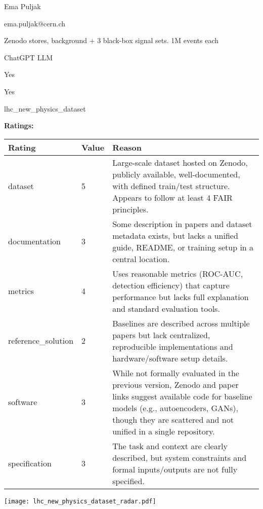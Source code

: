 {{\begin{description}[labelwidth=4cm, labelsep=1em, leftmargin=4cm, itemsep=0.1em, parsep=0em]
  \item[contact.name:] Ema Puljak
  \item[contact.email:] ema.puljak@cern.ch
  \item[datasets.links.name:] Zenodo stores, background + 3 black-box signal sets. 1M events each
  \item[results.links.name:] ChatGPT LLM
  \item[fair.reproducible:] Yes
  \item[fair.benchmark\_ready:] Yes
  \item[id:] lhc\_new\_physics\_dataset
  \item[Citations:] \cite{https://doi.org/10.5281/zenodo.5046389}
\end{description}

{\bf Ratings:} ~ \\

\begin{tabular}{p{} p{} p{}}
\hline
Rating & Value & Reason \\
\hline
dataset & 5 & Large-scale dataset hosted on Zenodo, publicly available, well-documented, with defined train/test structure.
Appears to follow at least 4 FAIR principles.
 \\
documentation & 3 & Some description in papers and dataset metadata exists, but lacks a unified guide, README,
or training setup in a central location.
 \\
metrics & 4 & Uses reasonable metrics (ROC-AUC, detection efficiency) that capture performance but lacks
full explanation and standard evaluation tools.
 \\
reference\_solution & 2 & Baselines are described across multiple papers but lack centralized, reproducible implementations
and hardware/software setup details.
 \\
software & 3 & While not formally evaluated in the previous version, Zenodo and paper links suggest available code for baseline models
(e.g., autoencoders, GANs), though they are scattered and not unified in a single repository.
 \\
specification & 3 & The task and context are clearly described, but system constraints and formal inputs/outputs are not fully specified.
 \\
\hline
\end{tabular}

\texttt{[image: lhc\_new\_physics\_dataset\_radar.pdf]}
}}
\clearpage